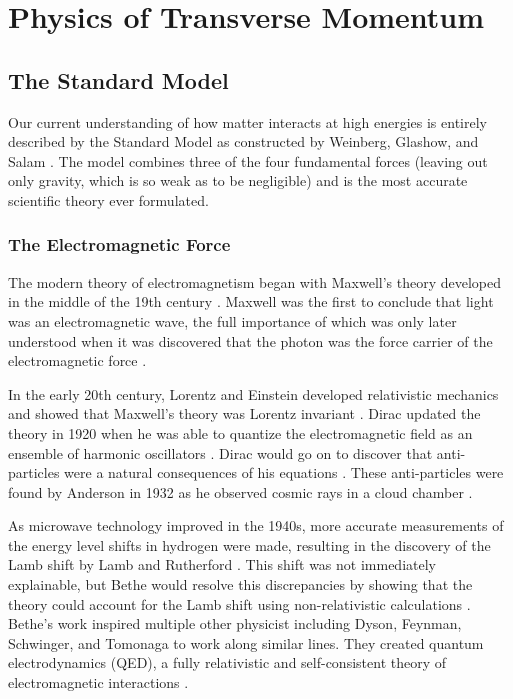 \chapter{Physics of \texorpdfstring{\Z}{Z} Transverse Momentum}
\label{chapter:theory}

\section{The Standard Model}
\label{section:standard_model}

Our current understanding of how matter interacts at high energies is entirely
described by the Standard Model as constructed by Weinberg, Glashow, and Salam
\cite{glashow1961,weinberg1967,salam1968}. The model combines three of the four
fundamental forces (leaving out only gravity, which is so weak as to be
negligible) and is the most accurate scientific theory ever formulated.

\subsection{The Electromagnetic Force}
\label{subsection:electronmagnetic_force}

The modern theory of electromagnetism began with Maxwell's theory developed in
the middle of the 19th century \cite{maxwell1873}. Maxwell was the first to
conclude that light was an electromagnetic wave, the full importance of which
was only later understood when it was discovered that the photon was the force
carrier of the electromagnetic force \cite{maxwell1865}.

In the early 20th century, Lorentz and Einstein developed relativistic
mechanics and showed that Maxwell's theory was Lorentz invariant
\cite{lorentz1899,einstein1904}. Dirac updated the theory in 1920 when he was
able to quantize the electromagnetic field as an ensemble of harmonic
oscillators \cite{dirac1927}. Dirac would go on to discover that anti-particles
were a natural consequences of his equations \cite{dirac1928,dirac1930}. These
anti-particles were found by Anderson in 1932 as he observed cosmic rays in a
cloud chamber \cite{anderson1933}.

As microwave technology improved in the 1940s, more accurate measurements of
the energy level shifts in hydrogen were made, resulting in the discovery of
the Lamb shift by Lamb and Rutherford \cite{lamb1947}. This shift was not
immediately explainable, but Bethe would resolve this discrepancies by showing
that the theory could account for the Lamb shift using non-relativistic
calculations \cite{bethe1947}. Bethe's work inspired multiple other physicist
including Dyson, Feynman, Schwinger, and Tomonaga to work along similar lines.
They created quantum electrodynamics (QED), a fully relativistic and
self-consistent theory of electromagnetic interactions
\cite{tomonaga1946,schwinger1948,feynman1949,dyson1949}.


